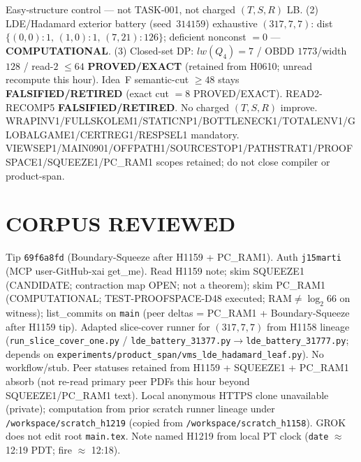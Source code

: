 \documentclass[11pt]{article}
\begin{document}
Easy-structure control --- not TASK-001, not charged $(T,S,R)$ LB.
(2) LDE/Hadamard exterior battery (seed~$314159$) exhaustive $(317,7,7)$:
dist $\{(0,0){:}1,\,(1,0){:}1,\,(7,21){:}126\}$; deficient nonconst $=0$ --- \textbf{COMPUTATIONAL}.
(3) Closed-set DP: $lw(Q_4)=7$ / OBDD $1773$/width $128$ / read-$2$ $\le64$
\textbf{PROVED/EXACT} (retained from H0610; unread recompute this hour).
Idea~F semantic-cut $\ge48$ stays \textbf{FALSIFIED/RETIRED} (exact cut $=8$ PROVED/EXACT).
READ2-RECOMP5 \textbf{FALSIFIED/RETIRED}. No charged $(T,S,R)$ improve.
WRAPINV1/FULLSKOLEM1/STATICNP1/BOTTLENECK1/TOTALENV1/GLOBALGAME1/CERTREG1/RESPSEL1 mandatory.
VIEWSEP1/MAIN0901/OFFPATH1/SOURCESTOP1/PATHSTRAT1/PROOFSPACE1/SQUEEZE1/PC\_RAM1 scopes retained; do not close compiler or product-span.

\section*{CORPUS REVIEWED}
Tip \texttt{69f6a8fd} (Boundary-Squeeze after H1159 + PC\_RAM1). Auth \texttt{j15marti} (MCP user-GitHub-xai get\_me).
Read H1159 note; skim SQUEEZE1 (CANDIDATE; contraction map OPEN; not a theorem);
skim PC\_RAM1 (COMPUTATIONAL; TEST-PROOFSPACE-D48 executed; RAM$\neq\log_2 66$ on witness);
list\_commits on \texttt{main} (peer deltas = PC\_RAM1 + Boundary-Squeeze after H1159 tip).
Adapted slice-cover runner for $(317,7,7)$ from H1158 lineage
(\texttt{run\_slice\_cover\_one.py} / \texttt{lde\_battery\_31377.py}$\to$\texttt{lde\_battery\_31777.py};
depends on \texttt{experiments/product\_span/vms\_lde\_hadamard\_leaf.py}).
No workflow/stub. Peer statuses retained from H1159 + SQUEEZE1 + PC\_RAM1 absorb
(not re-read primary peer PDFs this hour beyond SQUEEZE1/PC\_RAM1 text).
Local anonymous HTTPS clone unavailable (private);
computation from prior scratch runner lineage under \texttt{/workspace/scratch\_h1219}
(copied from \texttt{/workspace/scratch\_h1158}).
GROK does not edit root \texttt{main.tex}.
Note named H1219 from local PT clock (\texttt{date} $\approx$ 12:19 PDT; fire $\approx$ 12:18).
\end{document}
